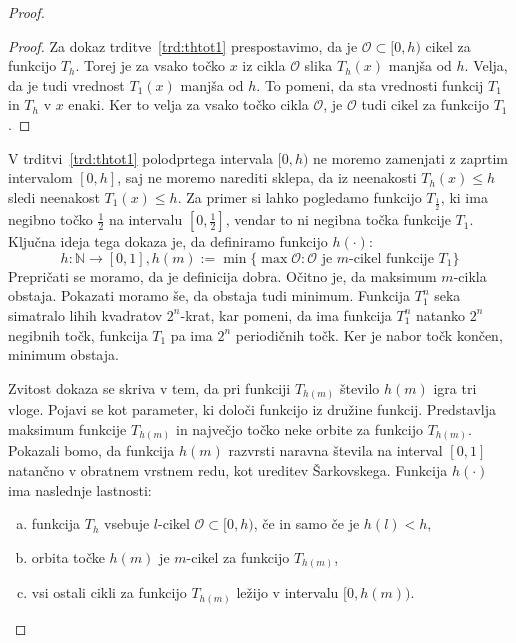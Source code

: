 \documentclass[mat2]{fmfdelo}
\newcommand{\N}{\mathbb N}
\begin{document}
\begin{proof}
\begin{proof}
Za dokaz trditve~\ref{trd:thtot1} prespostavimo, da je $\mathcal{O} \subset [0, h)$ cikel za funkcijo $T_h$. Torej je za vsako točko $x$ iz cikla $\mathcal{O}$ slika $T_h(x)$ manjša od $h$. Velja, da je tudi vrednost $T_1(x)$ manjša od $h$. To pomeni, da sta vrednosti funkcij $T_1$ in $T_h$ v $x$ enaki. Ker to velja za vsako točko cikla $\mathcal{O}$, je $\mathcal{O}$ tudi cikel za funkcijo $T_1$.
\end{proof}
V trditvi~\ref{trd:thtot1} polodprtega intervala $[0, h)$ ne moremo zamenjati z zaprtim intervalom $[0, h]$, saj ne moremo narediti sklepa, da iz neenakosti $T_h(x) \leq h$ sledi neenakost $T_1(x) \leq h$. Za primer si lahko pogledamo funkcijo $T_{\frac{1}{2}}$, ki ima negibno točko $\frac{1}{2}$ na intervalu $[0, \frac{1}{2}]$, vendar to ni negibna točka funkcije $T_1$.
Ključna ideja tega dokaza je, da definiramo funkcijo $h(\cdot)$:
$$h: \N \to [0, 1], h(m) := \min\{\max \mathcal{O}: \mathcal{O}\text{ je }m\text{-cikel funkcije }T_1 \}$$
Prepričati se moramo, da je definicija dobra. Očitno je, da maksimum $m$-cikla obstaja. Pokazati moramo še, da obstaja tudi minimum. Funkcija $T_1^n$ seka simatralo lihih kvadratov $2^n$-krat, kar pomeni, da ima funkcija $T_1^n$ natanko $2^n$ negibnih točk, funkcija $T_1$ pa ima $2^n$ periodičnih točk. Ker je nabor točk končen, minimum obstaja.

Zvitost dokaza se skriva v tem, da pri funkciji $T_{h(m)}$ število $h(m)$ igra tri vloge. Pojavi se kot parameter, ki določi funkcijo iz družine funkcij. Predstavlja maksimum funkcije $T_{h(m)}$ in največjo točko neke orbite za funkcijo $T_{h(m)}$. Pokazali bomo, da funkcija $h(m)$ razvrsti naravna števila na interval $[0, 1]$ natančno v obratnem vrstnem redu, kot ureditev Šarkovskega.
Funkcija $h(\cdot)$ ima naslednje lastnosti:
\begin{enumerate}[(a)]
\item funkcija $T_h$  vsebuje $l$-cikel $\mathcal{O}\subset [0, h)$, če in samo če je $h(l)<h$,\label{l1}
\item orbita točke $h(m)$ je $m$-cikel za funkcijo $T_{h(m)}$,\label{l2}
\item vsi ostali cikli za funkcijo $T_{h(m)}$ ležijo v intervalu $[0, h(m)).$\label{l3}
\end{enumerate}


\end{proof}
\end{document}
